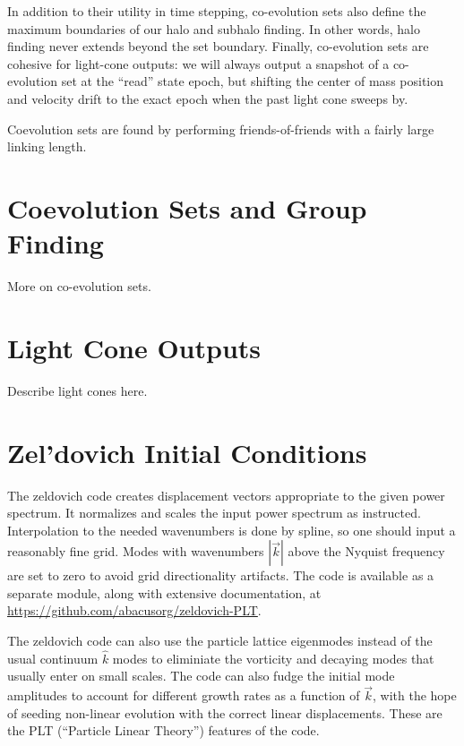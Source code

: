 \documentclass[11pt,preprint]{aastex}
\newenvironment{private}{\comment}{\endcomment}
\newenvironment{private}
    {\textbf{Not public:}\\
    \begin{tabular}{|p{0.9\textwidth}|}
    \hline\\
    }
    {
    \\\\\hline
    \end{tabular}
    }
\begin{document}
In addition to their utility in time stepping, co-evolution sets
also define the maximum boundaries of our halo and subhalo finding.
In other words, halo finding never extends beyond the set boundary.
Finally, co-evolution sets are cohesive for light-cone outputs: we
will always output a snapshot of a co-evolution set at the ``read''
state epoch, but shifting the center of mass position and velocity
drift to the exact epoch when the past light cone sweeps by.

Coevolution sets are found by performing friends-of-friends with a
fairly large linking length.

\begin{private}
\section{Coevolution Sets and Group Finding}

More on co-evolution sets.
\end{private}

\begin{private}
\section{Light Cone Outputs}

Describe light cones here.
\end{private}

\section{Zel'dovich Initial Conditions}

The zeldovich code creates displacement vectors appropriate to 
the given power spectrum.  It normalizes and scales the input
power spectrum as instructed.  Interpolation to the needed wavenumbers
is done by spline, so one should input a reasonably fine grid.
Modes with wavenumbers $|\vec{k}|$ above the Nyquist frequency are
set to zero to avoid grid directionality artifacts.
The code is available as a separate module, along with extensive documentation,
at \url{https://github.com/abacusorg/zeldovich-PLT}.

The zeldovich code can also use the particle lattice eigenmodes
instead of the usual continuum $\hat{k}$ modes to eliminiate
the vorticity and decaying modes that usually enter on small scales.
The code can also fudge the initial mode amplitudes to account for
different growth rates as a function of $\vec{k}$, with the hope of
seeding non-linear evolution with the correct linear displacements.
These are the PLT (``Particle Linear Theory'') features of the code.
\end{document}
